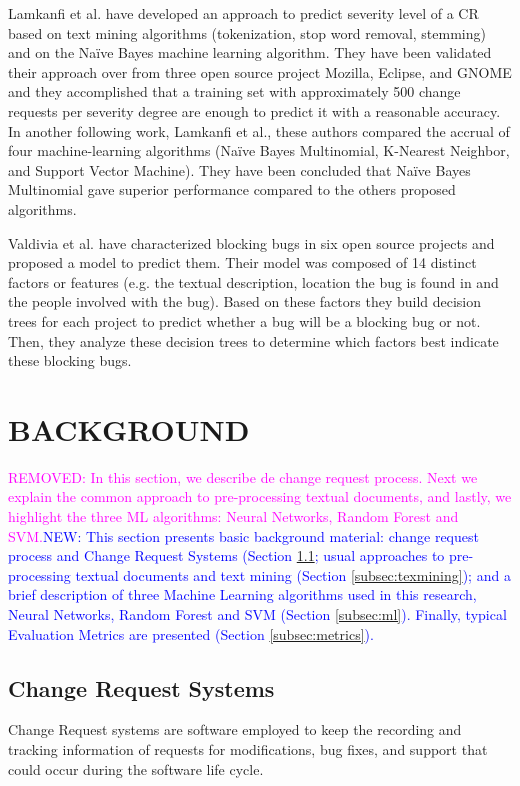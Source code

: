\documentclass[10pt, conference]{IEEEtran}
\newcommand{\rem}[1]{\noindent\textcolor{magenta}{REMOVED: {#1}}}
\newcommand{\new}[1]{\noindent\textcolor{blue}{NEW: {#1}}}
\newcommand{\rem}[1]{}
\newcommand{\new}[1]{#1}
\begin{document}
Lamkanfi et al.\cite{Lamkanfi2010} have developed an approach to predict severity level of a CR based on text mining algorithms (tokenization, stop word removal, stemming) and on the Naïve Bayes machine learning algorithm. They have been validated their approach over from three open source project Mozilla, Eclipse, and GNOME and they accomplished that a training set with approximately 500 change requests per severity degree are enough to predict it with a reasonable accuracy. In another following work, Lamkanfi et al.\cite{Lamkanfi2011}, these authors compared the accrual of four machine-learning algorithms (Naïve Bayes Multinomial, K-Nearest Neighbor, and Support Vector Machine). They have been concluded that Naïve Bayes Multinomial gave superior performance compared to the others proposed algorithms.

Valdivia et al.\cite{ValdiviaGarcia2014} have characterized blocking bugs in six open source projects and proposed a model to predict them. Their model was composed of 14 distinct factors or features (e.g. the textual description, location the bug is found in and the people involved with the bug). Based on these factors they build decision trees for each project to predict whether a bug will be a blocking bug or not. Then, they analyze these decision trees to determine which factors best indicate these blocking bugs. 

\section{BACKGROUND} \label{sec:background} 
\rem{In this section, we describe de change request process. Next we explain the common approach to pre-processing textual documents, and lastly, we highlight the three ML algorithms: Neural Networks, Random Forest and SVM.}\new{This section presents basic background material: change request process and Change Request Systems (Section \ref{subsec:crs}; usual approaches to pre-processing textual documents and text mining (Section \ref{subsec:texmining}); and a brief description of three Machine Learning algorithms used in this research, Neural Networks, Random Forest and SVM (Section \ref{subsec:ml}). Finally, typical Evaluation Metrics are presented (Section \ref{subsec:metrics}). }

\subsection{Change Request Systems}		\label{subsec:crs}
Change Request systems\cite{Pressman2009} are software employed to keep the recording and tracking information of requests for modifications, bug fixes, and support that could occur during the software life cycle. 
\end{document}
